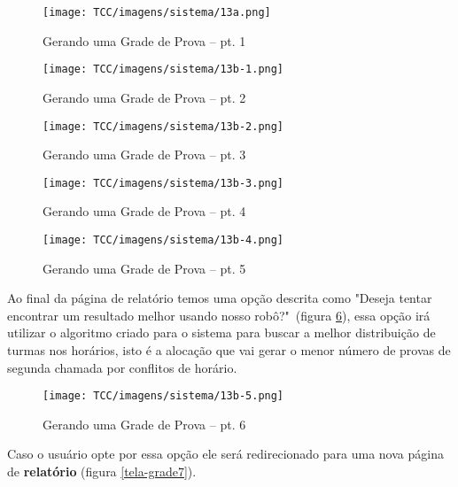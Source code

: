 \begin{anexosenv}
\begin{figure}[H]
     \centering
     \texttt{[image: TCC/imagens/sistema/13a.png]}
     \caption{Gerando uma Grade de Prova -- pt. 1}
     \label{tela-grade1}
\end{figure}

\begin{figure}[H]
     \centering
     \texttt{[image: TCC/imagens/sistema/13b-1.png]}
     \caption{Gerando uma Grade de Prova -- pt. 2}
     \label{tela-grade2}
\end{figure}



\begin{figure}[H]
     \centering
     \texttt{[image: TCC/imagens/sistema/13b-2.png]}
     \caption{Gerando uma Grade de Prova -- pt. 3}
     \label{tela-grade3}
\end{figure}

\begin{figure}[H]
     \centering
     \texttt{[image: TCC/imagens/sistema/13b-3.png]}
     \caption{Gerando uma Grade de Prova -- pt. 4}
     \label{tela-grade4}
\end{figure}

\begin{figure}[H]
     \centering
     \texttt{[image: TCC/imagens/sistema/13b-4.png]}
     \caption{Gerando uma Grade de Prova -- pt. 5}
     \label{tela-grade5}
\end{figure}

Ao final da página de relatório temos uma opção descrita como "Deseja tentar encontrar um resultado melhor usando nosso robô?"\ (figura \ref{tela-grade6}), essa opção irá utilizar o algoritmo criado para o sistema para buscar a melhor distribuição de turmas nos horários, isto é a alocação que vai gerar o menor número de provas de segunda chamada por conflitos de horário. 


\begin{figure}[H]
     \centering
     \texttt{[image: TCC/imagens/sistema/13b-5.png]}
     \caption{Gerando uma Grade de Prova -- pt. 6}
     \label{tela-grade6}
\end{figure}

Caso o usuário opte por essa opção ele será redirecionado para uma nova página de \textbf{relatório} (figura \ref{tela-grade7}). 


\end{anexosenv}
